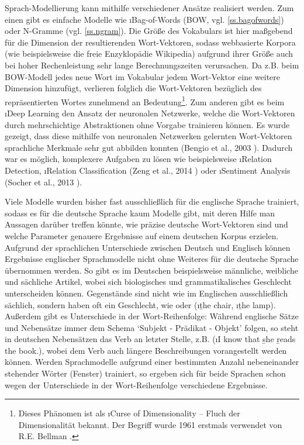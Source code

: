 Sprach-Modellierung kann mithilfe verschiedener Ansätze realisiert werden. Zum einen gibt es einfache Modelle wie \i{Bag-of-Words} (BOW, vgl. \autoref{ss.bagofwords}) oder N-Gramme (vgl. \autoref{ss.ngram}). Die Größe des Vokabulars ist hier maßgebend für die Dimension der resultierenden Wort-Vektoren, sodass webbasierte Korpora (wie beispielsweise die freie Enzyklopädie Wikipedia) aufgrund ihrer Größe auch bei hoher Rechenleistung sehr lange Berechnungszeiten verursachen. Da z.B. beim BOW-Modell jedes neue Wort im Vokabular jedem Wort-Vektor eine weitere Dimension hinzufügt, verlieren folglich die Wort-Vektoren bezüglich des repräsentierten Wortes zunehmend an Bedeutung\footnote{Dieses Phänomen ist als \i{Curse of Dimensionality} – Fluch der Dimensionalität bekannt. Der Begriff wurde 1961 erstmals verwendet von R.E. Bellman \citep{Bellman1961}.}. Zum anderen gibt es beim \i{Deep Learning} den Ansatz der neuronalen Netzwerke, welche die Wort-Vektoren durch mehrschichtige Abstraktionen ohne Vorgabe trainieren können. Es wurde gezeigt, dass diese mithilfe von neuronalen Netzwerken gelernten Wort-Vektoren sprachliche Merkmale sehr gut abbilden konnten (Bengio et al., 2003 \citep{Bengio2003}). Dadurch war es möglich, komplexere Aufgaben zu lösen wie beispielsweise \i{Relation Detection}, \i{Relation Classification} (Zeng et al., 2014 \citep{Zeng2014}) oder \i{Sentiment Analysis} (Socher et al., 2013 \citep{Socher2013}).

Viele Modelle wurden bisher fast ausschließlich für die englische Sprache trainiert, sodass es für die deutsche Sprache kaum Modelle gibt, mit deren Hilfe man Aussagen darüber treffen könnte, wie präzise deutsche Wort-Vektoren sind und welche Parameter genauere Ergebnisse auf einem deutschen Korpus erzielen. Aufgrund der sprachlichen Unterschiede zwischen Deutsch und Englisch können Ergebnisse englischer Sprachmodelle nicht ohne Weiteres für die deutsche Sprache übernommen werden. So gibt es im Deutschen beispielsweise männliche, weibliche und sächliche Artikel, wobei sich biologisches und grammatikalisches Geschlecht unterscheiden können. Gegenstände sind nicht wie im Englischen ausschließlich sächlich, sondern haben oft ein Geschlecht, wie   oder  (\i{\b{the} chair}, \i{\b{the} lamp}). Außerdem gibt es Unterschiede in der Wort-Reihenfolge: Während englische Sätze und Nebensätze immer dem Schema `Subjekt - Prädikat - Objekt' folgen, so steht in deutschen Nebensätzen das Verb an letzter Stelle, z.B.  (\i{I know that \b{she} \b{reads} the book.}), wobei dem Verb auch längere Beschreibungen vorangestellt werden können. Werden Sprachmodelle aufgrund einer bestimmten Anzahl nebeneinander stehender Wörter (Fenster) trainiert, so ergeben sich für beide Sprachen schon wegen der Unterschiede in der Wort-Reihenfolge verschiedene Ergebnisse.

